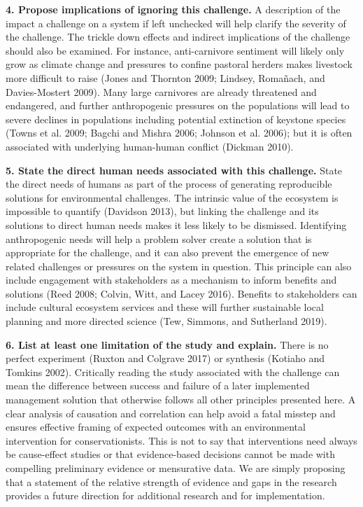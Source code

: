 \documentclass[fleqn,10pt]{wlpeerj} %
\begin{document}
\textbf{4. Propose implications of ignoring this challenge.} A
description of the impact a challenge on a system if left unchecked will
help clarify the severity of the challenge. The trickle down effects and
indirect implications of the challenge should also be examined. For
instance, anti-carnivore sentiment will likely only grow as climate
change and pressures to confine pastoral herders makes livestock more
difficult to raise (Jones and Thornton 2009; Lindsey, Romañach, and
Davies-Mostert 2009). Many large carnivores are already threatened and
endangered, and further anthropogenic pressures on the populations will
lead to severe declines in populations including potential extinction of
keystone species (Towns et al. 2009; Bagchi and Mishra 2006; Johnson et
al. 2006); but it is often associated with underlying human-human
conflict (Dickman 2010).

\textbf{5. State the direct human needs associated with this challenge.}
State the direct needs of humans as part of the process of generating
reproducible solutions for environmental challenges. The intrinsic value
of the ecosystem is impossible to quantify (Davidson 2013), but linking
the challenge and its solutions to direct human needs makes it less
likely to be dismissed. Identifying anthropogenic needs will help a
problem solver create a solution that is appropriate for the challenge,
and it can also prevent the emergence of new related challenges or
pressures on the system in question. This principle can also include
engagement with stakeholders as a mechanism to inform benefits and
solutions (Reed 2008; Colvin, Witt, and Lacey 2016). Benefits to
stakeholders can include cultural ecosystem services and these will
further sustainable local planning and more directed science (Tew,
Simmons, and Sutherland 2019).

\textbf{6. List at least one limitation of the study and explain.} There
is no perfect experiment (Ruxton and Colgrave 2017) or synthesis
(Kotiaho and Tomkins 2002). Critically reading the study associated with
the challenge can mean the difference between success and failure of a
later implemented management solution that otherwise follows all other
principles presented here. A clear analysis of causation and correlation
can help avoid a fatal misstep and ensures effective framing of expected
outcomes with an environmental intervention for conservationists. This
is not to say that interventions need always be cause-effect studies or
that evidence-based decisions cannot be made with compelling preliminary
evidence or mensurative data. We are simply proposing that a statement
of the relative strength of evidence and gaps in the research provides a
future direction for additional research and for implementation.
\end{document}
